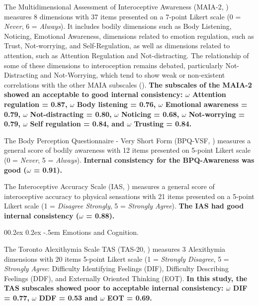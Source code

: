 \documentclass[
  man,
  floatsintext,
  longtable,
  nolmodern,
  notxfonts,
  notimes,
  mask,
  colorlinks=true,linkcolor=blue,citecolor=blue,urlcolor=blue]{apa7}
\makeatletter
\renewcommand{\paragraph}{\@startsection{paragraph}{4}{\parindent}%
	{0\baselineskip \@plus 0.2ex \@minus 0.2ex}%
	{-.5em}%
	{\normalfont\normalsize\bfseries\typesectitle}}
\makeatother
\begin{document}
The Multidimensional Assessment of Interoceptive Awareness (MAIA-2,
)
measures 8 dimensions with 37 items presented on a 7-point Likert scale
(0 = \emph{Never}, 6 = \emph{Always}). It includes bodily dimensions
such as Body Listening, Noticing, Emotional Awareness, dimensions
related to emotion regulation, such as Trust, Not-worrying, and
Self-Regulation, as well as dimensions related to attention, such as
Attention Regulation and Not-distracting. The relationship of some of
these dimensions to interoception remains debated, particularly
Not-Distracting and Not-Worrying, which tend to show weak or
non-existent correlations with the other MAIA subscales
().
\textbf{The subscales of the MAIA-2 showed an acceptable to good
internal consistency: \(\omega\) Attention regulation = 0.87, \(\omega\)
Body listening = 0.76, \(\omega\) Emotional awareness = 0.79, \(\omega\)
Not-distracting = 0.80, \(\omega\) Noticing = 0.68, \(\omega\)
Not-worrying = 0.79, \(\omega\) Self regulation = 0.84, and \(\omega\)
Trusting = 0.84.}

The Body Perception Questionnaire - Very Short Form (BPQ-VSF,
) measures a
general score of bodily awareness with 12 items presented on 5-point
Likert scale (0 = \emph{Never}, 5 = \emph{Always}). \textbf{Internal
consistency for the BPQ-Awareness was good (\(\omega\) = 0.91).}

The Interoceptive Accuracy Scale (IAS,
) measures a
general score of interoceptive accuracy to physical sensations with 21
items presented on a 5-point Likert scale (1 = \emph{Disagree Strongly},
5 = \emph{Strongly Agree}). \textbf{The IAS had good internal
consistency (\(\omega\) = 0.88).}

\paragraph{Emotions and Cognition.}\label{emotions-and-cognition}

The Toronto Alexithymia Scale TAS (TAS-20,
) measures 3
Alexithymia dimensions with 20 items 5-point Likert scale (1 =
\emph{Strongly Disagree}, 5 = \emph{Strongly Agree}: Difficulty
Identifying Feelings (DIF), Difficulty Describing Feelings (DDF), and
Externally Oriented Thinking (EOT). \textbf{In this study, the TAS
subscales showed poor to acceptable internal consistency: \(\omega\) DIF
= 0.77, \(\omega\) DDF = 0.53 and \(\omega\) EOT = 0.69.}
\end{document}
